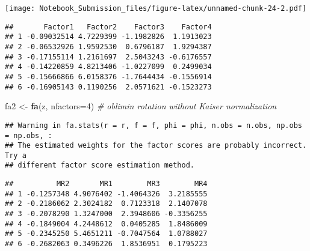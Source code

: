 \documentclass[
]{article}
\newenvironment{Shaded}{\begin{snugshade}}{\end{snugshade}}
\newcommand{\CommentTok}[1]{\textcolor[rgb]{0.56,0.35,0.01}{\textit{#1}}}
\newcommand{\DataTypeTok}[1]{\textcolor[rgb]{0.13,0.29,0.53}{#1}}
\newcommand{\DecValTok}[1]{\textcolor[rgb]{0.00,0.00,0.81}{#1}}
\newcommand{\FloatTok}[1]{\textcolor[rgb]{0.00,0.00,0.81}{#1}}
\newcommand{\KeywordTok}[1]{\textcolor[rgb]{0.13,0.29,0.53}{\textbf{#1}}}
\newcommand{\NormalTok}[1]{#1}
\newcommand{\OperatorTok}[1]{\textcolor[rgb]{0.81,0.36,0.00}{\textbf{#1}}}
\newcommand{\StringTok}[1]{\textcolor[rgb]{0.31,0.60,0.02}{#1}}
\begin{document}
\texttt{[image: Notebook\_Submission\_files/figure-latex/unnamed-chunk-24-2.pdf]}

\begin{Shaded}
\end{Shaded}

\begin{verbatim}
##       Factor1   Factor2    Factor3    Factor4
## 1 -0.09032514 4.7229399 -1.1982826  1.1913023
## 2 -0.06532926 1.9592530  0.6796187  1.9294387
## 3 -0.17155114 1.2161697  2.5043243 -0.6176557
## 4 -0.14220859 4.8213406 -1.0227099  0.2499034
## 5 -0.15666866 6.0158376 -1.7644434 -0.1556914
## 6 -0.16905143 0.1190256  2.0571621 -0.1523273
\end{verbatim}

\begin{Shaded}
\begin{Highlighting}[]
\NormalTok{fa2 <-}\StringTok{ }\KeywordTok{fa}\NormalTok{(z, }\DataTypeTok{nfactors=}\DecValTok{4}\NormalTok{) }\CommentTok{# oblimin rotation without Kaiser normalization}
\end{Highlighting}
\end{Shaded}

\begin{verbatim}
## Warning in fa.stats(r = r, f = f, phi = phi, n.obs = n.obs, np.obs = np.obs, :
## The estimated weights for the factor scores are probably incorrect. Try a
## different factor score estimation method.
\end{verbatim}

\begin{Shaded}
\end{Shaded}

\begin{verbatim}
##          MR2       MR1        MR3        MR4
## 1 -0.1257348 4.9076402 -1.4064326  3.2185555
## 2 -0.2186062 2.3024182  0.7123318  2.1407078
## 3 -0.2078290 1.3247000  2.3948606 -0.3356255
## 4 -0.1849004 4.2448612  0.0405285  1.8486009
## 5 -0.2345250 5.4651211 -0.7047564  1.0788027
## 6 -0.2682063 0.3496226  1.8536951  0.1795223
\end{verbatim}
\end{document}
